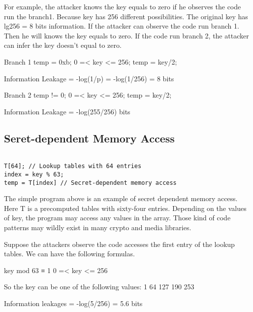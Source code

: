 For example, the attacker knows the key equals to zero if he observes the code run the branch1. Because key has 256 different possibilities. The original key has lg256 = 8 bits information. If the attacker can observe the code run branch 1. Then he will knows the key equals to zero. If the code run branch 2, the attacker can infer the key doesn’t equal to zero. 

Branch 1
temp = 0xb;
0 =< key <= 256;
temp = key/2;

Information Leakage = -log(1/p) = -log(1/256) = 8 bits

Branch 2
temp != 0; 
0 =< key <= 256;
temp = key/2;

Information Leakage = -log(255/256) bits

\subsection{Seret-dependent Memory Access}

\begin{lstlisting}

T[64]; // Lookup tables with 64 entries
index = key % 63;
temp = T[index] // Secret-dependent memory access       

\end{lstlisting}

The simple program above is an example of secret dependent memory access. Here T is a precomputed tables with sixty-four entries. Depending on the values of key, the program may access any values in the array. Those kind of code patterns may wildly exist in many crypto and media libraries. 

Suppose the attackers observe the code accesses the first entry of the lookup tables. We can have the following formulas.

key mod 63 ≡ 1
0 =< key <= 256

So the key can be one of the following values:
1 64 127 190 253

Information leakages = -log(5/256) =  5.6 bits

